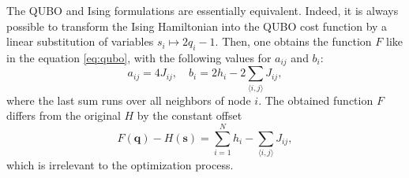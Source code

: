 The QUBO and Ising formulations are essentially equivalent. Indeed, it is
always possible to transform the Ising Hamiltonian into the QUBO cost function
by a linear substitution of variables $s_i \mapsto 2q_i-1$. Then, one obtains
the function $F$ like in the equation \eqref{eq:qubo}, with the following
values for $a_{ij}$ and $b_{i}$:
\begin{equation}
  \label{eq:toQUBO}
  a_{ij}= 4J_{ij},
  \quad
  b_i= 2h_i - 2 \sum_{\langle i, j \rangle} J_{ij},
\end{equation}
where the last sum runs over all neighbors of node $i$. The obtained function $F$ differs from the original $H$ by the constant offset
\begin{equation}
  F(\mathbf{q}) - H(\mathbf{s}) =\sum_{i=1}^N h_i - \sum_{\langle i, j \rangle} J_{ij},
\end{equation}
which is irrelevant to the optimization process.

